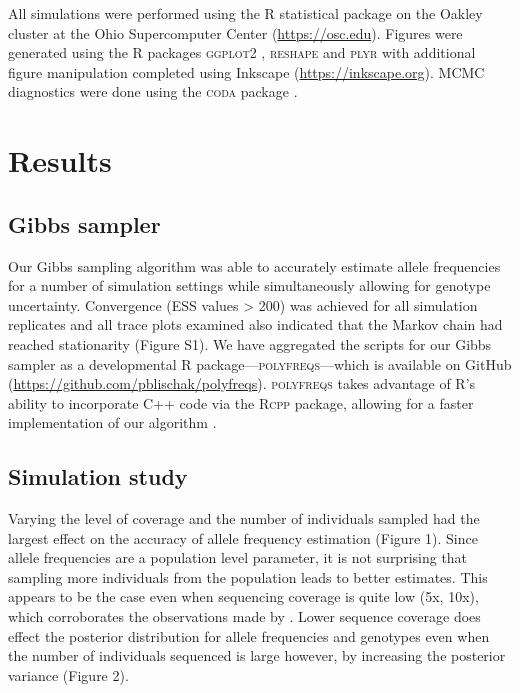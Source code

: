 \documentclass[11pt,english,letterpaper,oneside]{article}
\begin{document}
All simulations were performed using the R statistical package \citep{r2014} on the Oakley cluster at the Ohio Supercomputer Center (\url{https://osc.edu}). Figures were generated using the R packages \textsc{ggplot2} \citep{wickham2009ggplot2}, \textsc{reshape} \citep{wickham2011plyr} and \textsc{plyr} \citep{wickham2007reshape} with additional figure manipulation completed using Inkscape (\url{https://inkscape.org}). MCMC diagnostics were done using the \textsc{coda} package \citep{plummer2006coda}.
\medskip

\section*{Results}         %

\subsection*{Gibbs sampler}
\medskip

Our Gibbs sampling algorithm was able to accurately estimate allele frequencies for a number of simulation settings while simultaneously allowing for genotype uncertainty. Convergence (ESS values > 200) was achieved for all simulation replicates and all trace plots examined also indicated that the Markov chain had reached stationarity (Figure S1). We have aggregated the scripts for our Gibbs sampler as a developmental R package---\textsc{polyfreqs}---which is available on GitHub (\url{https://github.com/pblischak/polyfreqs}). \textsc{polyfreqs} takes advantage of R's ability to incorporate C++ code via the \textsc{Rcpp} package, allowing for a faster implementation of our algorithm \citep{eddelbuettel2011rcpp,eddelbuettel2013rcppBook}.

\medskip
\subsection*{Simulation study}
\medskip

Varying the level of coverage and the number of individuals sampled had the largest effect on the accuracy of allele frequency estimation (Figure 1). Since allele frequencies are a population level parameter, it is not surprising that sampling more individuals from the population leads to better estimates. This appears to be the case even when sequencing coverage is quite low (5x, 10x), which corroborates the observations made by \cite{buerkle2013popModels}. Lower sequence coverage does effect the posterior distribution for allele frequencies and genotypes even when the number of individuals sequenced is large however, by increasing the posterior variance (Figure 2).
\medskip
\end{document}
